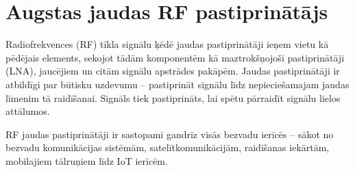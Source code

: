 \section{Augstas jaudas RF pastiprinātājs}
Radiofrekvences \cite{poweramplifieroverview} (RF) tīkla signālu ķēdē jaudas pastiprinātāji ieņem vietu kā pēdējais elements, sekojot tādām komponentēm kā maztrokšņojoši pastiprinātāji (LNA), jaucējiem un citām signālu apstrādes pakāpēm. Jaudas pastiprinātāji ir atbildīgi par būtisku uzdevumu – pastiprināt signālu līdz nepieciešamajam jaudas līmenim tā raidīšanai. Signāls tiek pastiprināts, lai spētu pārraidīt signālu lielos attālumos.

RF jaudas pastiprinātāji ir sastopami gandrīz visās bezvadu ierīcēs – sākot no bezvadu komunikācijas sistēmām, satelītkomunikācijām, raidīšanas iekārtām, mobilajiem tālruņiem līdz IoT ierīcēm.
